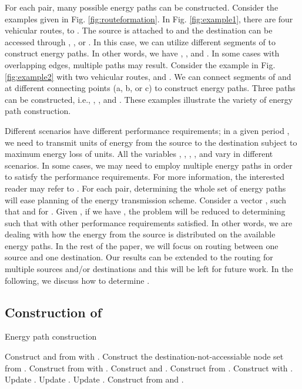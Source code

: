 \documentclass[journal]{IEEEtran}
\begin{document}
For each  pair, many possible energy paths can be constructed. Consider the examples given in Fig. \ref{fig:routeformation}. In Fig. \ref{fig:example1}, there are four vehicular routes,  to . The source  is attached to  and the destination  can be accessed through , , or . In this case, we can utilize different segments of  to construct energy paths. In other words, we have , , and . In some cases with overlapping edges, multiple paths may result. Consider the example in Fig. \ref{fig:example2} with two vehicular routes,  and . We can connect segments of  and  at different connecting points (a, b, or c) to construct energy paths. Three paths can be constructed, i.e., , , and . These examples illustrate the variety of  energy path construction.

Different scenarios have different performance requirements; in a given period , we need to transmit  units of energy from the source  to the destination  subject to maximum energy loss of  units. All the variables , , , , and  vary in different scenarios. In some cases, we may need to employ multiple energy paths in order to satisfy the performance requirements. For more information, the interested reader may refer to \cite{VEN}. For each  pair,  determining the whole set of energy paths  will ease planning of the energy transmission scheme. 
Consider a vector , such that  and  for . Given , if we have , the problem will be reduced to determining  such that  with other performance requirements satisfied.
In other words, we are dealing with how the energy from the source is distributed on the available energy paths. 
In the rest of the paper, we will focus on routing between one source and one destination. Our results can be extended to the routing for multiple sources and/or destinations  and this will be left for future work. 
In the following, we discuss how to determine .


\subsection{Construction of }  \label{sec:construction}

\begin{algorithm}
\caption{Energy path construction} \label{pathalgo}
\begin{algorithmic}[1]
\STATE Construct  and  from  with .
\STATE Construct the destination-not-accessiable node set  from .
\STATE Construct  from  with .
\STATE Construct  and .
\REPEAT
	\FORALL {}
		\STATE Construct  from .
			\STATE Construct  with .
			\STATE Update .
		\ENDFOR
	\ENDFOR
		\STATE Update .
	\ENDFOR
	\STATE Update .
\UNTIL {}
\STATE Construct  from  and .
\end{algorithmic}
\end{algorithm}
\end{document}
